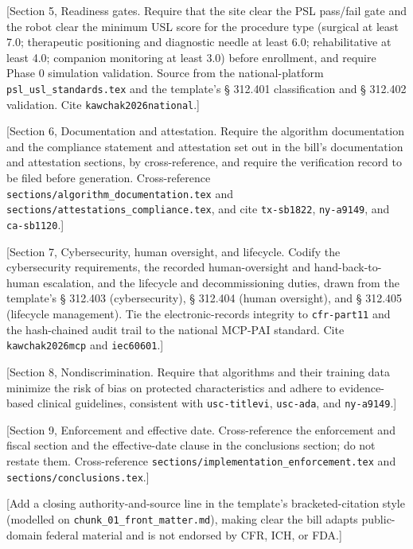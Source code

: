 [Section 5, Readiness gates. Require that the site clear the PSL pass/fail gate and
the robot clear the minimum USL score for the procedure type (surgical at least
7.0; therapeutic positioning and diagnostic needle at least 6.0; rehabilitative at
least 4.0; companion monitoring at least 3.0) before enrollment, and require Phase
0 simulation validation. Source from the national-platform
\texttt{psl\_usl\_standards.tex} and the template's § 312.401 classification and
§ 312.402 validation. Cite \texttt{kawchak2026national}.]

[Section 6, Documentation and attestation. Require the algorithm documentation and
the compliance statement and attestation set out in the bill's documentation and
attestation sections, by cross-reference, and require the verification record to
be filed before generation. Cross-reference
\texttt{sections/algorithm\_documentation.tex} and
\texttt{sections/attestations\_compliance.tex}, and cite \texttt{tx-sb1822},
\texttt{ny-a9149}, and \texttt{ca-sb1120}.]

[Section 7, Cybersecurity, human oversight, and lifecycle. Codify the cybersecurity
requirements, the recorded human-oversight and hand-back-to-human escalation, and
the lifecycle and decommissioning duties, drawn from the template's § 312.403
(cybersecurity), § 312.404 (human oversight), and § 312.405 (lifecycle
management). Tie the electronic-records integrity to \texttt{cfr-part11} and the
hash-chained audit trail to the national MCP-PAI standard. Cite
\texttt{kawchak2026mcp} and \texttt{iec60601}.]

[Section 8, Nondiscrimination. Require that algorithms and their training data
minimize the risk of bias on protected characteristics and adhere to evidence-
based clinical guidelines, consistent with \texttt{usc-titlevi},
\texttt{usc-ada}, and \texttt{ny-a9149}.]

[Section 9, Enforcement and effective date. Cross-reference the enforcement and
fiscal section and the effective-date clause in the conclusions section; do not
restate them. Cross-reference \texttt{sections/implementation\_enforcement.tex} and
\texttt{sections/conclusions.tex}.]

[Add a closing authority-and-source line in the template's bracketed-citation
style (modelled on \texttt{chunk\_01\_front\_matter.md}), making clear the bill
adapts public-domain federal material and is not endorsed by CFR, ICH, or FDA.]
